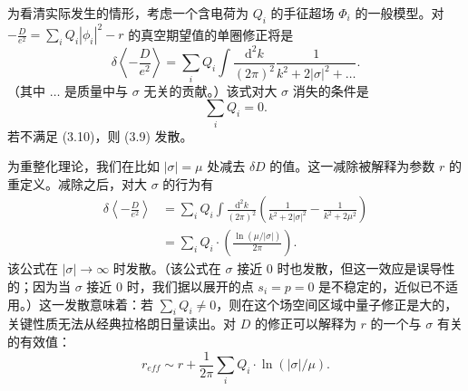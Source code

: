 为看清实际发生的情形，考虑一个含电荷为 $Q_i$ 的手征超场 $\Phi_i$ 的一般模型。对 $-\frac{D}{e^2}=\sum_iQ_i|\phi_i|^2-r$ 的真空期望值的单圈修正将是
\begin{equation}\tag{3.9}
\delta\left\langle-\frac{D}{e^2}\right\rangle=\sum_iQ_i\int\frac{\mathrm{d}^2k}{(2\pi)^2}\frac{1}{k^2+2|\sigma|^2+\ldots}.
\end{equation}
（其中 $\ldots$ 是质量中与 $\sigma$ 无关的贡献。）该式对大 $\sigma$ 消失的条件是
\label{op:22}
\begin{equation}\tag{3.10}
\sum_iQ_i=0.
\end{equation}
若不满足 (3.10)，则 (3.9) 发散。


为重整化理论，我们在比如 $|\sigma|=\mu$ 处减去 $\delta D$ 的值。这一减除被解释为参数 $r$ 的重定义。减除之后，对大 $\sigma$ 的行为有
\begin{equation}\tag{3.11}
\begin{aligned}
\delta\left\langle-\frac{D}{e^2}\right\rangle
&=\sum_iQ_i\int\frac{\mathrm{d}^2k}{(2\pi)^2}\left(\frac{1}{k^2+2|\sigma|^2}-\frac{1}{k^2+2\mu^2}\right)\\
&=\sum_iQ_i\cdot\left(\frac{\ln(\mu/|\sigma|)}{2\pi}\right).
\end{aligned}
\end{equation}
该公式在 $|\sigma|\to\infty$ 时发散。（该公式在 $\sigma$ 接近 0 时也发散，但这一效应是误导性的；因为当 $\sigma$ 接近 0 时，我们据以展开的点 $s_i=p=0$ 是不稳定的，近似已不适用。）这一发散意味着：若 $\sum_iQ_i\neq0$，则在这个场空间区域中量子修正是大的，关键性质无法从经典拉格朗日量读出。对 $D$ 的修正可以解释为 $r$ 的一个与 $\sigma$ 有关的有效值：
\begin{equation}\tag{3.12}
r_{eff}\sim r+\frac{1}{2\pi}\sum_iQ_i\cdot\ln(|\sigma|/\mu).
\end{equation}

